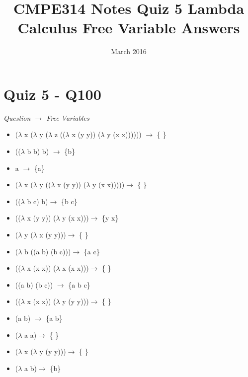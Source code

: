 \documentclass{article}
\title{CMPE314 Notes Quiz 5 Lambda Calculus Free Variable Answers}
\date{March 2016}
\begin{document}
\maketitle

\section{Quiz 5 - Q100}
\textit{Question $\rightarrow$ Free Variables}

 \begin{itemize}
	\item ($\lambda$ x ($\lambda$ y ($\lambda$ z (($\lambda$ x (y y)) ($\lambda$ y (x x)))))) $\rightarrow$ \{ \}
	\item (($\lambda$ b b) b) $\rightarrow$ \{b\}
	\item a $\rightarrow$ \{a\}
	\item ($\lambda$ x ($\lambda$ y (($\lambda$ x (y y)) ($\lambda$ y (x x)))))$\rightarrow$ \{ \}
	\item (($\lambda$ b c) b)$\rightarrow$ \{b c\}
	\item (($\lambda$ x (y y)) ($\lambda$ y (x x)))$\rightarrow$ \{y x\}
	\item ($\lambda$ y ($\lambda$ x (y y)))$\rightarrow$ \{ \}
	\item ($\lambda$ b ((a b) (b c)))$\rightarrow$ \{a c\}
	\item (($\lambda$ x (x x)) ($\lambda$ x (x x)))$\rightarrow$ \{ \}
	\item ((a b) (b c)) $\rightarrow$ \{a b c\}
	\item (($\lambda$ x (x x)) ($\lambda$ y (y y)))$\rightarrow$ \{ \}
	\item (a b) $\rightarrow$ \{a b\}
	\item ($\lambda$ a a)$\rightarrow$ \{ \}
	\item ($\lambda$ x ($\lambda$ y (y y)))$\rightarrow$ \{ \}
	\item ($\lambda$ a b)$\rightarrow$ \{b\}
 \end{itemize}
 
 
\end{document}
